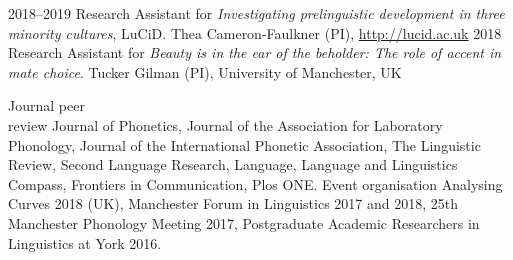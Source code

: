 \documentclass[9pt]{developercv} %
\begin{document}


\begin{entrylist}
	\entry
		{2018--2019}
		{\textnormal{Research Assistant for \textit{Investigating prelinguistic development in three minority cultures}, LuCiD.}}
		{}
		{Thea Cameron-Faulkner (PI), \url{http://lucid.ac.uk}}
	\entry
		{2018}
		{\textnormal{Research Assistant for \textit{Beauty is in the ear of the beholder: The role of accent in mate choice}.}}
		{}
		{Tucker Gilman (PI), University of Manchester, UK}
\end{entrylist}



\begin{entrylist}
	\entry
		{Journal peer \\ review}
		{\textnormal{Journal of Phonetics, Journal of the Association for Laboratory Phonology, Journal of the International Phonetic Association, The Linguistic Review, Second Language Research, Language, Language and Linguistics Compass, Frontiers in Communication, Plos ONE.}}
		{}
		{}
	\entry
		{Event organisation}
		{\textnormal{Analysing Curves 2018 (UK), Manchester Forum in Linguistics 2017 and 2018, 25th Manchester Phonology Meeting 2017, Postgraduate Academic Researchers in Linguistics at York 2016.}}
		{}
		{}
\end{entrylist}

\end{document}

